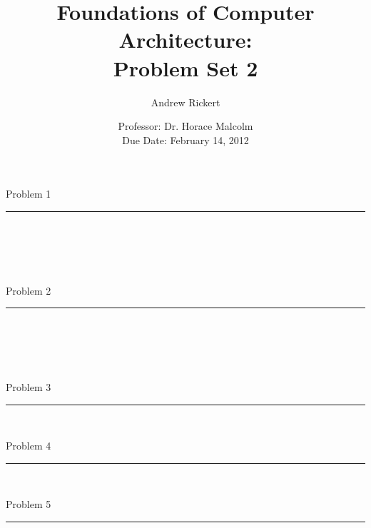 \documentclass[11pt,reqno]{article}
\title{Foundations of Computer Architecture: \\ Problem Set 2 }
\author{Andrew Rickert}
\date{Professor: Dr. Horace Malcolm \\ \hspace{-19pt} Due Date: February 14,  2012}                                           %
\begin{document}
\maketitle


\begin{flushleft} 
Problem 1 \\
\rule{500pt}{1pt}\\
\end{flushleft} 
\\ 

\noindent{}\\ 


\begin{flushleft} 
Problem 2 \\
\rule{500pt}{1pt}\\
\end{flushleft} 
\\ 


\noindent {}\\ 


\begin{flushleft} 
Problem 3 \\
\rule{500pt}{1pt}\\
\end{flushleft} 


\begin{flushleft} 
Problem 4 \\
\rule{500pt}{1pt}\\
\end{flushleft} 


\begin{flushleft} 
Problem 5 \\
\rule{500pt}{1pt}\\
\end{flushleft} 
\\ 

\noindent {}\\ 

\noindent {}\\ 

\noindent {}\\ 

\noindent {}\\ 
\end{document}
